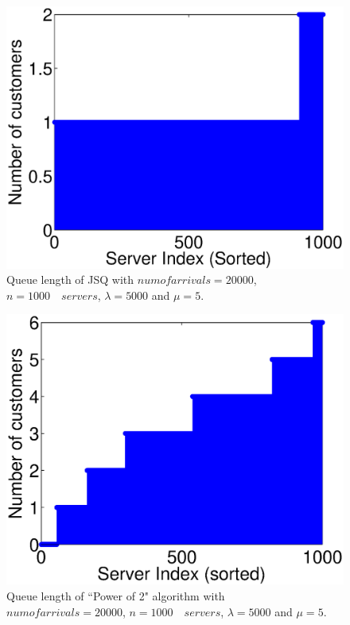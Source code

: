 \documentclass[a4paper,english,11pt]{article}
\begin{document}
\begin{figure}[H]
\centering
\includegraphics[scale=0.50]{JSQ_quelength.eps}
\caption{Queue length of JSQ with $num of arrivals = 20000$, $n = 1000 \quad servers$, $\lambda = 5000$ and $\mu = 5$.} 
\end{figure}

\begin{figure}[H]
\centering
\includegraphics[scale=0.55]{Powerof2_quelengthN1000lambda5000.eps}
\caption{Queue length of ``Power of 2" algorithm with $num of arrivals = 20000$, $n = 1000 \quad servers$, $\lambda = 5000$ and $\mu = 5$.} 
\end{figure}
\end{document}
